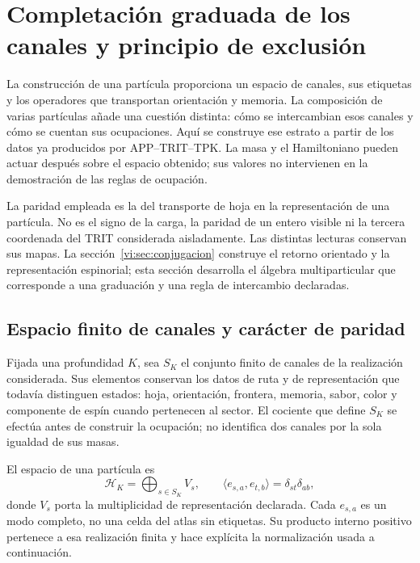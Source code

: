 \section{Completación graduada de los canales y principio de exclusión}
\label{vi:sec:fock-pauli}

La construcción de una partícula proporciona un espacio de canales, sus
etiquetas y los operadores que transportan orientación y memoria. La
composición de varias partículas añade una cuestión distinta: cómo se
intercambian esos canales y cómo se cuentan sus ocupaciones. Aquí se
construye ese estrato a partir de los datos ya producidos por
APP--TRIT--TPK. La masa y el Hamiltoniano pueden actuar después sobre
el espacio obtenido; sus valores no intervienen en la demostración de
las reglas de ocupación.

La paridad empleada es la del transporte de hoja en la representación
de una partícula. No es el signo de la carga, la paridad de un entero
visible ni la tercera coordenada del TRIT considerada aisladamente.
Las distintas lecturas conservan sus mapas. La
sección~\ref{vi:sec:conjugacion} construye el retorno orientado y la
representación espinorial; esta sección desarrolla el álgebra
multiparticular que corresponde a una graduación y una regla de
intercambio declaradas.

\subsection{Espacio finito de canales y carácter de paridad}
\label{vi:subsec:canales-graduados}

Fijada una profundidad \(K\), sea \(S_K\) el conjunto finito de
canales de la realización considerada. Sus elementos conservan los
datos de ruta y de representación que todavía distinguen estados:
hoja, orientación, frontera, memoria, sabor, color y componente de
espín cuando pertenecen al sector. El cociente que define \(S_K\)
se efectúa antes de construir la ocupación; no identifica dos canales
por la sola igualdad de sus masas.

El espacio de una partícula es
\begin{equation}
 \mathcal H_K=\bigoplus_{s\in S_K}V_s,
 \qquad\langle e_{s,a},e_{t,b}\rangle=\delta_{st}\delta_{ab},
 \label{vi:eq:espacio-canales-fock}
\end{equation}
donde \(V_s\) porta la multiplicidad de representación declarada.
Cada \(e_{s,a}\) es un modo completo, no una celda del atlas sin
etiquetas. Su producto interno positivo pertenece a esa realización
finita y hace explícita la normalización usada a continuación.

